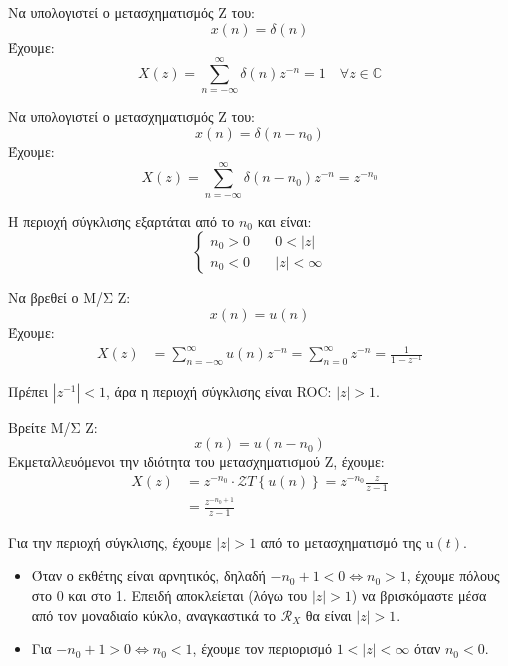 \documentclass[11pt,a4paper,notitlepage,fleqn]{article}
\let\mytodo\todo
\renewcommand{\todo}[1]{\par\mytodo[inline,noline]{#1}}
\begin{document}
\begin{exercise}
	Να υπολογιστεί ο μετασχηματισμός Z του:
	\[
	x(n) = δ(n)
	\]
	\tcblower
	Έχουμε:
	\[
	X(z) = \sum_{n=-\infty}^{\infty} δ(n)z^{-n} = 1 \quad \forall z\in \mathbb C 
	\]
\end{exercise}

\begin{exercise}
	Να υπολογιστεί ο μετασχηματισμός Z του:
	\[
	x(n) = δ(n-n_0)
	\]
	\tcblower
	Έχουμε:
	\[
	X(z) = \sum_{n=-\infty}^{\infty} δ(n-n_0)z^{-n} = z^{-n_0}
	\]
	
	Η περιοχή σύγκλισης εξαρτάται από το \( n_0 \) και είναι:
	\[
	\begin{cases}
	n_0 > 0 &\quad 0 < |z|\\
	n_0 < 0 &\quad |z| < \infty
	\end{cases}
	\]
\end{exercise}

\begin{exercise}
	Να βρεθεί ο Μ/Σ Z:
	\[
	x(n) = u(n)
	\]
	\tcblower
	Έχουμε:
	\begin{align*}
		X(z) &= \sum_{n=-\infty}^\infty u(n)z^{-n} = \sum_{n=0}^{\infty} z^{-n}
		= \frac{1}{1-z^{-1}}
	\end{align*}
	
	Πρέπει \( |z^{-1}| < 1 \), άρα η περιοχή σύγκλισης είναι ROC: \( |z|>1 \).
\end{exercise}

\begin{exercise}
	Βρείτε Μ/Σ Z:
	\[
	x(n) = u(n-n_0)
	\]
	\tcblower
	Εκμεταλλευόμενοι την ιδιότητα του μετασχηματισμού Z, έχουμε:
	\begin{align*}
		X(z) &=z^{-n_0} \cdot \mathcal{Z}T\left\lbrace u(n) \right\rbrace
		= z^{-n_0}\frac{z}{z-1}
		\\ &= \frac{z^{-n_0+1}}{z-1}
	\end{align*}
	
	Για την περιοχή σύγκλισης, έχουμε \( |z|>1 \) από το μετασχηματισμό της
	\( \mathrm{u}(t) \).
	\begin{itemize}
		\item Όταν ο εκθέτης είναι αρνητικός, δηλαδή \( -n_0+1 < 0 \iff n_0 > 1 \), έχουμε
		πόλους στο 0 και στο 1. Επειδή αποκλείεται (λόγω του \( |z|>1 \)) να
		βρισκόμαστε μέσα από τον μοναδιαίο κύκλο, αναγκαστικά το \( \mathcal{R}_X \) θα
		είναι \( |z|>1 \).
		\item Για \( -n_0 + 1 > 0 \iff n_0 < 1 \), έχουμε τον περιορισμό \( 1<|z|<\infty \) όταν
		\( n_0 < 0 \). \todo{Explain}
	\end{itemize}
\end{exercise}
\end{document}
